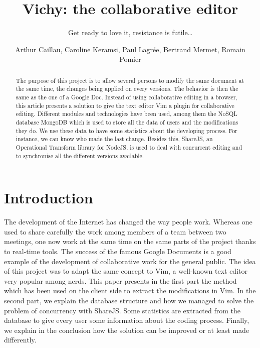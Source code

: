 \documentclass{llncs}
\begin{document}
\title{Vichy: the collaborative editor}
\subtitle{Get ready to love it, resistance is futile\ldots}

\author{Arthur Caillau, Caroline Keramsi, Paul Lagrée, Bertrand Mermet, Romain Pomier}

\maketitle

\begin{abstract}

The purpose of this project is to allow several persons to modify the same document at the same time, the changes being applied on every versions. The behavior is then the same as the one of a Google Doc. Instead of using collaborative editing in a browser, this article presents a solution to give the text editor Vim a plugin for collaborative editing. Different modules and technologies have been used, among them the NoSQL database MongoDB which is used to store all the data of users and the
modifications they do. We use these data to have some statistics about the developing process. For instance, we can know who made the last change. Besides this, ShareJS, an Operational Transform library for NodeJS, is used to deal with concurrent editing and to synchronise all the different versions available.

\end{abstract}

\section{Introduction}\label{sec:Introduction}

The development of the Internet has changed the way people work. Whereas one used to share carefully the work among members of a team between two meetings, one now work at the same time on the same parts of the project thanks to real-time tools. The success of the famous Google Documents is a good example of the development of collaborative work for the general public. The idea of this project was to adapt the same concept to Vim, a well-known text editor very popular among nerds.
This paper presents in the first part the method which has been used on the client side to extract the modifications in Vim. In the second part, we explain the database structure and how we managed to solve the problem of concurrency with ShareJS. Some statistics are extracted from the database to give every user some information about the coding process. Finally, we explain in the conclusion how the solution can be improved or at least made differently.
\end{document}
